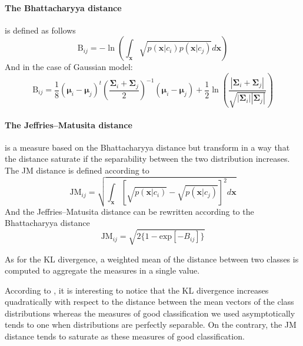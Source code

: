 \documentclass[a4paper,11pt,DIV=16,abstracton]{scrartcl}
\begin{document}
        \paragraph{The Bhattacharyya distance} is defined as follows
        \begin{equation}
            \text{B}_{ij} = - \ln \left( \int_\mathbf{x} \sqrt{p(\mathbf{x}|c_i) p(\mathbf{x}|c_j)} d\mathbf{x} \right)
        \end{equation}
        And in the case of Gaussian model:
        \begin{equation}
            \text{B}_{ij} = \frac{1}{8} (\boldsymbol{\mu}_i - \boldsymbol{\mu}_j)^t \left( \frac{\boldsymbol{\Sigma}_i + \boldsymbol{\Sigma}_j}{2} \right)^{-1} (\boldsymbol{\mu}_i - \boldsymbol{\mu}_j) + \frac{1}{2} \ln \left( \frac{|\boldsymbol{\Sigma}_i + \boldsymbol{\Sigma}_j|}{\sqrt{|\boldsymbol{\Sigma}_i| |\boldsymbol{\Sigma}_j|}} \right)
        \end{equation}

        \paragraph{The Jeffries–Matusita distance} is a measure based on the Bhattacharyya distance but transform in a way that the distance saturate if the separability between the two distribution increases. The JM distance is defined according to
        \begin{equation}
            \text{JM}_{ij} = \sqrt{ \int_\mathbf{x} \left[\sqrt{p(\mathbf{x}|c_i)} - \sqrt{p(\mathbf{x}|c_j)}\right]^2 d\mathbf{x} }
        \end{equation}
        And the Jeffries–Matusita distance can be rewritten according to the Bhattacharyya distance
        \begin{equation}
            \text{JM}_{ij} = \sqrt{ 2 \{1 - \text{exp}[-B_{ij}]\} }
        \end{equation}

        As for the KL divergence, a weighted mean of the distance between two classes is computed to aggregate the measures in a single value.

        \vspace{10 mm}

        According to \cite{bruzzone2009novel}, it is interesting to notice that the KL divergence increases quadratically with respect to the distance between the mean vectors of the class distributions whereas the measures of good classification we used asymptotically tends to one when distributions are perfectly separable. On the contrary, the JM distance tends to saturate as these measures of good classification.
\end{document}
